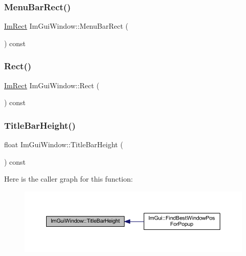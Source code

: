 \subsubsection{\texorpdfstring{Menu\+Bar\+Rect()}{MenuBarRect()}}
{\footnotesize\ttfamily \mbox{\hyperlink{struct_im_rect}{Im\+Rect}} Im\+Gui\+Window\+::\+Menu\+Bar\+Rect (\begin{DoxyParamCaption}{ }\end{DoxyParamCaption}) const\hspace{0.3cm}{\ttfamily [inline]}}

\mbox{\label{struct_im_gui_window_a147da28bf5d167cbe0a363c4a578dea1}} 
\subsubsection{\texorpdfstring{Rect()}{Rect()}}
{\footnotesize\ttfamily \mbox{\hyperlink{struct_im_rect}{Im\+Rect}} Im\+Gui\+Window\+::\+Rect (\begin{DoxyParamCaption}{ }\end{DoxyParamCaption}) const\hspace{0.3cm}{\ttfamily [inline]}}

\mbox{\label{struct_im_gui_window_ad1580cc8b5bdf981c6ed2eb22ecd7dbb}} 
\subsubsection{\texorpdfstring{Title\+Bar\+Height()}{TitleBarHeight()}}
{\footnotesize\ttfamily float Im\+Gui\+Window\+::\+Title\+Bar\+Height (\begin{DoxyParamCaption}{ }\end{DoxyParamCaption}) const\hspace{0.3cm}{\ttfamily [inline]}}

Here is the caller graph for this function\+:
\nopagebreak
\begin{figure}[H]
\begin{center}
\leavevmode
\includegraphics[width=350pt]{struct_im_gui_window_ad1580cc8b5bdf981c6ed2eb22ecd7dbb_icgraph}
\end{center}
\end{figure}
\mbox{\label{struct_im_gui_window_a06884e1bc80e460e51e1626b5b976196}} 
